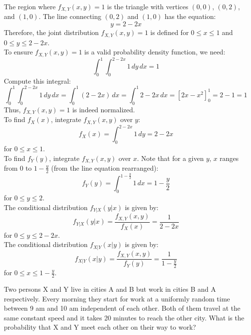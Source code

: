 \begin{solution}
The region where \( f_{X,Y}(x, y) = 1 \) is the triangle with vertices \( (0, 0) \), \( (0, 2) \), and \( (1, 0) \). The line connecting \( (0, 2) \) and \( (1, 0) \) has the equation:
    \[
    y = 2 - 2x
    \]
    Therefore, the joint distribution \( f_{X,Y}(x, y) = 1 \) is defined for \( 0 \leq x \leq 1 \) and \( 0 \leq y \leq 2 - 2x \).\\

To ensure \( f_{X,Y}(x, y) = 1 \) is a valid probability density function, we need:
    \[
    \int_0^1 \int_0^{2 - 2x} 1 \, dy \, dx = 1
    \]
    Compute this integral:
    \[
    \int_0^1 \int_0^{2 - 2x} 1 \, dy \, dx = \int_0^1 (2 - 2x) \, dx = \int_0^1 2 - 2x \, dx = \left[ 2x - x^2 \right]_0^1 = 2 - 1 = 1
    \]
    Thus, \( f_{X,Y}(x, y) = 1 \) is indeed normalized.\\

To find \( f_X(x) \), integrate \( f_{X,Y}(x, y) \) over \( y \):
    \[
    f_X(x) = \int_0^{2 - 2x} 1 \, dy = 2 - 2x
    \]
    for \( 0 \leq x \leq 1 \).\\

To find \( f_Y(y) \), integrate \( f_{X,Y}(x, y) \) over \( x \). Note that for a given \( y \), \( x \) ranges from \( 0 \) to \( 1 - \frac{y}{2} \) (from the line equation rearranged):
    \[
    f_Y(y) = \int_0^{1 - \frac{y}{2}} 1 \, dx = 1 - \frac{y}{2}
    \]
    for \( 0 \leq y \leq 2 \).\\

The conditional distribution \( f_{Y|X}(y|x) \) is given by:
    \[
    f_{Y|X}(y|x) = \frac{f_{X,Y}(x, y)}{f_X(x)} = \frac{1}{2 - 2x}
    \]
    for \( 0 \leq y \leq 2 - 2x \).\\

The conditional distribution \( f_{X|Y}(x|y) \) is given by:
    \[
    f_{X|Y}(x|y) = \frac{f_{X,Y}(x, y)}{f_Y(y)} = \frac{1}{1 - \frac{y}{2}}
    \]
    for \( 0 \leq x \leq 1 - \frac{y}{2} \).

\end{solution}


\begin{exercise}
Two persons X and Y live in cities A and B but work in cities B and A respectively. Every morning they start for work at a uniformly random time between 9 am and 10 am independent of each other. Both of them travel at the same constant speed and it takes 20 minutes to reach the other city. What is the probability that X and Y meet each other on their way to work?
\end{exercise}

